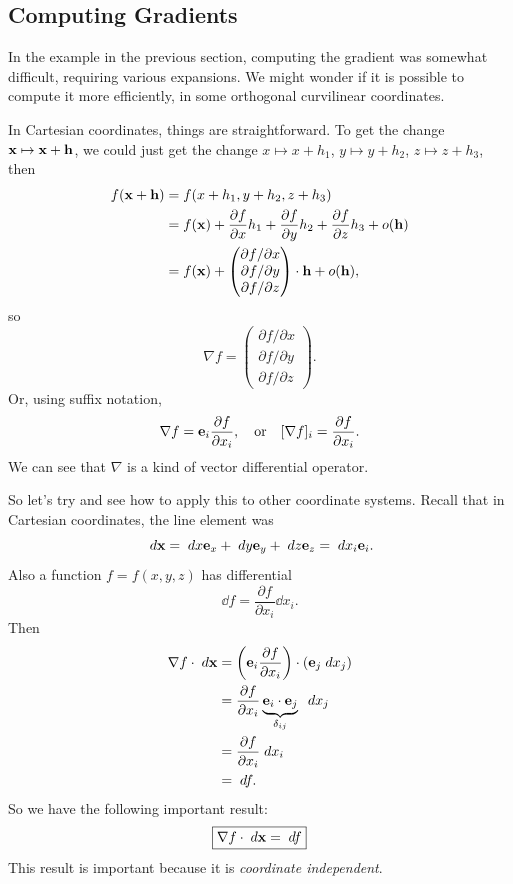 \documentclass[a4paper]{scrartcl}
\begin{document}
 \subsection{Computing Gradients}

In the example in the previous section, computing the gradient was somewhat difficult, requiring various expansions. We might wonder if it is possible to compute it more efficiently, in some orthogonal curvilinear coordinates.

In Cartesian coordinates, things are straightforward.
To get the change $\mathbf{x} \mapsto \mathbf{x} + \mathbf{h}$, we could just get the change $x \mapsto x + h_1$, $y \mapsto y + h_2$, $z \mapsto z + h_3$, then
\begin{align*}
f(\mathbf{x} + \mathbf{h}) &= f(x + h_1, y + h_2, z + h_3) \\
				   &= f(\mathbf{x}) + \frac{\partial f}{\partial x} h_1 + \frac{\partial f}{\partial y} h_2  + \frac{\partial f}{\partial z} h_3 + o(\mathbf{h}) \\
				   &= f(\mathbf{x}) +  \begin{pmatrix}
					\partial f / \partial x \\
					\partial f / \partial y \\
					\partial f / \partial z 
				   \end{pmatrix} \cdot \mathbf{h} + o(\mathbf{h}),
\end{align*}
so
$$
\nabla f = \begin{pmatrix}
	\partial f / \partial x \\
	\partial f / \partial y \\
	\partial f / \partial z 
   \end{pmatrix}.
$$
Or, using suffix notation, 
$$
\nabla f = \mathbf{e}_i \frac{\partial f}{\partial x_i}, \quad \text{or} \quad [\nabla f]_i = \frac{\partial f}{\partial x_i}.
$$
We can see that $\nabla$ is a kind of vector differential operator.

So let's try and see how to apply this to other coordinate systems. Recall that in Cartesian coordinates, the line element was
$$
\; d \mathbf{x} = \; d x \mathbf{e}_x + \; d y \mathbf{e}_y + \; d z \mathbf{e}_z = \; d x_i \mathbf{e}_i.
$$
Also a function $f = f(x, y, z)$ has differential
$$
\dd f = \frac{\partial f}{\partial x_i} \dd x_i.
$$
Then
\begin{align*}
	\nabla f \cdot \; d \mathbf{x} &= \left(\mathbf{e}_i \frac{\partial f}{\partial x_i}\right) \cdot (\mathbf{e}_j \; d x_j) \\
	&= \frac{\partial f}{\partial x_i} \underbrace{\mathbf{e}_i \cdot \mathbf{e}_j}_{\delta_{ij}} \; \; d x_j \\
	&= \frac{\partial f}{\partial x_i} \; d x_i \\
	&= \; d f.
\end{align*}
So we have the following important result:
$$
\boxed{\nabla f \cdot \; d \mathbf{x} = \; d f}
$$
This result is important because it is \emph{coordinate independent}.
\end{document}
